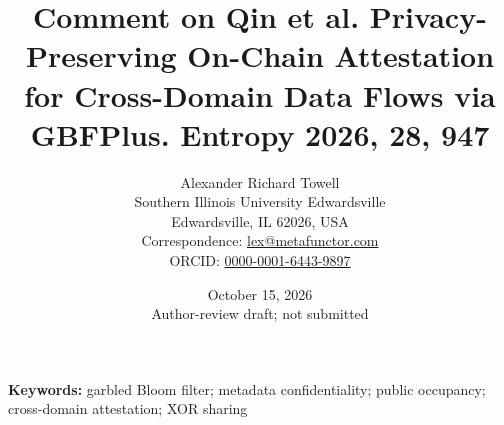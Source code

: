 \documentclass[11pt]{article}
\title{\Large Comment on Qin et al. Privacy-Preserving On-Chain Attestation for Cross-Domain Data Flows via GBFPlus. Entropy 2026, 28, 947}
\author{Alexander Richard Towell\\
\small Southern Illinois University Edwardsville\\
\small Edwardsville, IL 62026, USA\\
\small Correspondence: \href{mailto:lex@metafunctor.com}{lex@metafunctor.com}\\
\small ORCID: \href{https://orcid.org/0000-0001-6443-9897}{0000-0001-6443-9897}}
\date{October 15, 2026\\\small Author-review draft; not submitted}
\begin{document}
\maketitle
\begin{abstract}

\end{abstract}
\noindent\textbf{Keywords:} garbled Bloom filter; metadata confidentiality;
public occupancy; cross-domain attestation; XOR sharing




\end{document}

